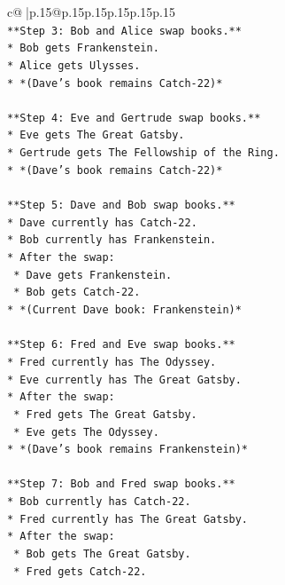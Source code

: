 \documentclass{article}
\begin{document}
{\begin{supertabular}{c@{$\;$}|p{.15\linewidth}@{}p{.15\linewidth}p{.15\linewidth}p{.15\linewidth}p{.15\linewidth}p{.15\linewidth}}
{{{\\ 
\texttt{**Step 3: Bob and Alice swap books.**} \\
\texttt{*   Bob gets Frankenstein.} \\
\texttt{*   Alice gets Ulysses.} \\
\texttt{*   *(Dave's book remains Catch{-}22)*} \\
\\ 
\texttt{**Step 4: Eve and Gertrude swap books.**} \\
\texttt{*   Eve gets The Great Gatsby.} \\
\texttt{*   Gertrude gets The Fellowship of the Ring.} \\
\texttt{*   *(Dave's book remains Catch{-}22)*} \\
\\ 
\texttt{**Step 5: Dave and Bob swap books.**} \\
\texttt{*   Dave currently has Catch{-}22.} \\
\texttt{*   Bob currently has Frankenstein.} \\
\texttt{*   After the swap:} \\
\texttt{    *   Dave gets Frankenstein.} \\
\texttt{    *   Bob gets Catch{-}22.} \\
\texttt{*   *(Current Dave book: Frankenstein)*} \\
\\ 
\texttt{**Step 6: Fred and Eve swap books.**} \\
\texttt{*   Fred currently has The Odyssey.} \\
\texttt{*   Eve currently has The Great Gatsby.} \\
\texttt{*   After the swap:} \\
\texttt{    *   Fred gets The Great Gatsby.} \\
\texttt{    *   Eve gets The Odyssey.} \\
\texttt{*   *(Dave's book remains Frankenstein)*} \\
\\ 
\texttt{**Step 7: Bob and Fred swap books.**} \\
\texttt{*   Bob currently has Catch{-}22.} \\
\texttt{*   Fred currently has The Great Gatsby.} \\
\texttt{*   After the swap:} \\
\texttt{    *   Bob gets The Great Gatsby.} \\
\texttt{    *   Fred gets Catch{-}22.} \\
}}}
\end{supertabular}}
\end{document}
